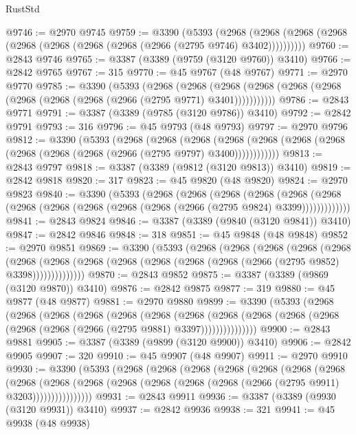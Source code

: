 \begin{lexlean}{RustStd}
\begin{coremodule}
{\begin{coremodule}
{{{{{{{{{{{{{{{{{{{{{{{{{{{{{{{{{@9746 := @2970 @9745
@9759 := @3390
    (@5393
      (@2968 (@2968 (@2968 (@2968 (@2968 (@2968 (@2968 (@2968 (@2966 (@2795 @9746) @3402))))))))))
@9760 := @2843 @9746
@9765 := @3387 (@3389 (@9759 (@3120 @9760)) @3410)
@9766 := @2842 @9765
@9767 := 315
@9770 := @45 @9767 (@48 @9767)
@9771 := @2970 @9770
@9785 := @3390
    (@5393
      (@2968
        (@2968
          (@2968 (@2968 (@2968 (@2968 (@2968 (@2968 (@2968 (@2966 (@2795 @9771) @3401)))))))))))
@9786 := @2843 @9771
@9791 := @3387 (@3389 (@9785 (@3120 @9786)) @3410)
@9792 := @2842 @9791
@9793 := 316
@9796 := @45 @9793 (@48 @9793)
@9797 := @2970 @9796
@9812 := @3390
    (@5393
      (@2968
        (@2968
          (@2968
            (@2968 (@2968 (@2968 (@2968 (@2968 (@2968 (@2968 (@2966 (@2795 @9797) @3400))))))))))))
@9813 := @2843 @9797
@9818 := @3387 (@3389 (@9812 (@3120 @9813)) @3410)
@9819 := @2842 @9818
@9820 := 317
@9823 := @45 @9820 (@48 @9820)
@9824 := @2970 @9823
@9840 := @3390
    (@5393
      (@2968
        (@2968
          (@2968
            (@2968
              (@2968
                (@2968 (@2968 (@2968 (@2968 (@2968 (@2968 (@2966 (@2795 @9824) @3399)))))))))))))
@9841 := @2843 @9824
@9846 := @3387 (@3389 (@9840 (@3120 @9841)) @3410)
@9847 := @2842 @9846
@9848 := 318
@9851 := @45 @9848 (@48 @9848)
@9852 := @2970 @9851
@9869 := @3390
    (@5393
      (@2968
        (@2968
          (@2968
            (@2968
              (@2968
                (@2968
                  (@2968 (@2968 (@2968 (@2968 (@2968 (@2968 (@2966 (@2795 @9852) @3398))))))))))))))
@9870 := @2843 @9852
@9875 := @3387 (@3389 (@9869 (@3120 @9870)) @3410)
@9876 := @2842 @9875
@9877 := 319
@9880 := @45 @9877 (@48 @9877)
@9881 := @2970 @9880
@9899 := @3390
    (@5393
      (@2968
        (@2968
          (@2968
            (@2968
              (@2968
                (@2968
                  (@2968
                    (@2968
                      (@2968 (@2968 (@2968 (@2968 (@2968 (@2966 (@2795 @9881) @3397)))))))))))))))
@9900 := @2843 @9881
@9905 := @3387 (@3389 (@9899 (@3120 @9900)) @3410)
@9906 := @2842 @9905
@9907 := 320
@9910 := @45 @9907 (@48 @9907)
@9911 := @2970 @9910
@9930 := @3390
    (@5393
      (@2968
        (@2968
          (@2968
            (@2968
              (@2968
                (@2968
                  (@2968
                    (@2968
                      (@2968
                        (@2968
                          (@2968 (@2968 (@2968 (@2968 (@2966 (@2795 @9911) @3203))))))))))))))))
@9931 := @2843 @9911
@9936 := @3387 (@3389 (@9930 (@3120 @9931)) @3410)
@9937 := @2842 @9936
@9938 := 321
@9941 := @45 @9938 (@48 @9938)
}}}}}}}}}}}}}}}}}}}}}}}}}}}}}}}}}
\end{coremodule}}
\end{coremodule}
\end{lexlean}
